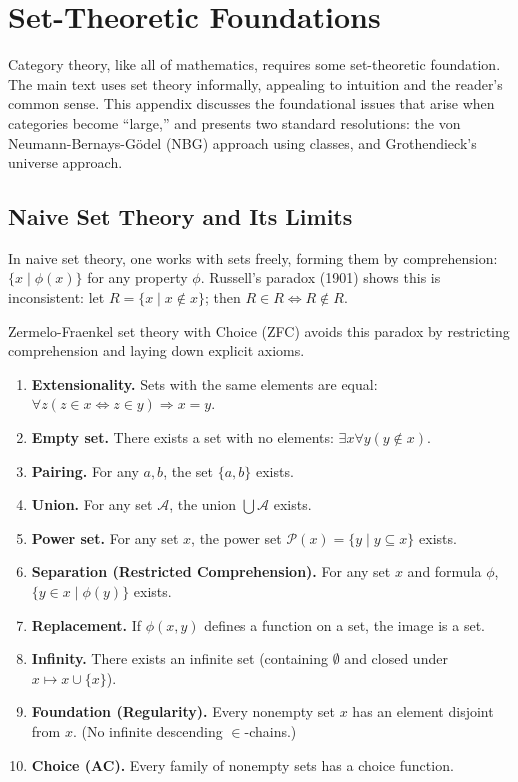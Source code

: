 \chapter{Set-Theoretic Foundations}
\label{app:foundations}

Category theory, like all of mathematics, requires some set-theoretic foundation. The main text uses set theory informally, appealing to intuition and the reader's common sense. This appendix discusses the foundational issues that arise when categories become ``large,'' and presents two standard resolutions: the von Neumann-Bernays-Gödel (NBG) approach using classes, and Grothendieck's universe approach.

\section{Naive Set Theory and Its Limits}

In naive set theory, one works with sets freely, forming them by comprehension: $\{x \mid \phi(x)\}$ for any property $\phi$. Russell's paradox (1901) shows this is inconsistent: let $R = \{x \mid x \notin x\}$; then $R \in R \iff R \notin R$.

Zermelo-Fraenkel set theory with Choice (ZFC) avoids this paradox by restricting comprehension and laying down explicit axioms.

\begin{definition}
\leavevmode
\begin{enumerate}
  \item \textbf{Extensionality.} Sets with the same elements are equal: $\forall z(z \in x \iff z \in y) \Rightarrow x = y$.
  \item \textbf{Empty set.} There exists a set with no elements: $\exists x \forall y (y \notin x)$.
  \item \textbf{Pairing.} For any $a, b$, the set $\{a,b\}$ exists.
  \item \textbf{Union.} For any set $\mathcal{A}$, the union $\bigcup \mathcal{A}$ exists.
  \item \textbf{Power set.} For any set $x$, the power set $\mathcal{P}(x) = \{y \mid y \subseteq x\}$ exists.
  \item \textbf{Separation (Restricted Comprehension).} For any set $x$ and formula $\phi$, $\{y \in x \mid \phi(y)\}$ exists.
  \item \textbf{Replacement.} If $\phi(x,y)$ defines a function on a set, the image is a set.
  \item \textbf{Infinity.} There exists an infinite set (containing $\emptyset$ and closed under $x \mapsto x \cup \{x\}$).
  \item \textbf{Foundation (Regularity).} Every nonempty set $x$ has an element disjoint from $x$. (No infinite descending $\in$-chains.)
  \item \textbf{Choice (AC).} Every family of nonempty sets has a choice function.
\end{enumerate}
\end{definition}

